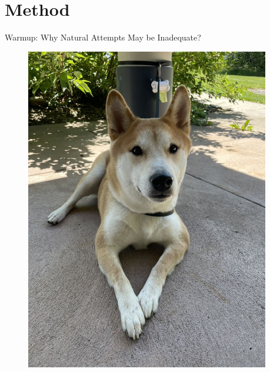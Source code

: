 \documentclass[10pt, xcolor=x11names,compress]{beamer}
\begin{document}
\section{Method}

\begin{frame}[label=Rocky]{Warmup: Why Natural Attempts May be Inadequate?}
\begin{figure}
 \begin{columns}[c]
  \begin{column}{0.3\textwidth}
    \centering
    \includegraphics[width=1\textwidth]{Figure2.jpg}
  \end{column}
  \begin{column}{0.3\textwidth}
    \centering

\end{column}
\end{columns}
\end{figure}
\end{frame}
\end{document}
